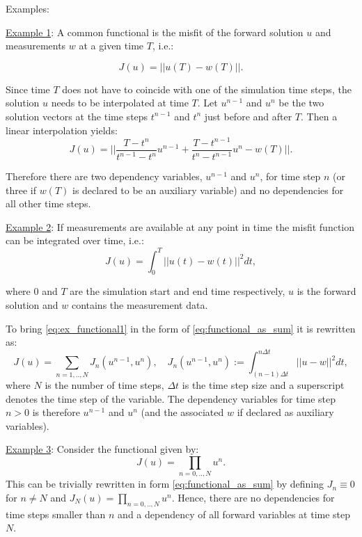 Examples:

\underline{Example 1}:
A common functional is the misfit of the forward solution $u$ and measurements $w$ at a given time $T$, i.e.:

\begin{equation}
J(u) = ||u(T) - w(T)||.
\label{eq:ex_functional1}
\end{equation}

Since time $T$ does not have to coincide with one of the simulation time steps, the solution $u$ needs to be interpolated at time $T$.
Let $u^{n-1}$ and $u^{n}$ be the two solution vectors at the time steps $t^{n-1}$ and $t^{n}$ just before and after $T$.
Then a linear interpolation yields:
\begin{equation}
J(u) = ||\frac{T-t^{n}}{t^{n-1}-t^{n}}u^{n-1} + \frac{T-t^{n-1}}{t^{n}-t^{n-1}}u^{n} - w(T)||.
\label{eq:ex_functional1}
\end{equation}

Therefore there are two dependency variables, $u^{n-1}$ and $u^{n}$, for time step $n$ (or three if $w(T)$ is declared to be an auxiliary variable) and no dependencies for all other time steps.

\underline{Example 2}:
If measurements are available at any point in time the misfit function can be integrated over time, i.e.: 
\begin{equation}
J(u) = \int_0^T ||u(t) - w(t)||^2 dt,
\label{eq:ex_functional1}
\end{equation}

where $0$ and $T$ are the simulation start and end time respectively, $u$ is the forward solution and $w$ contains the measurement data.


To bring \autoref{eq:ex_functional1} in the form of \autoref{eq:functional_as_sum} it is rewritten as:
\begin{equation}
J(u) = \sum_{n=1,..,N} J_n(u^{n-1}, u^{n}), \quad J_n(u^{n-1}, u^{n}) := \int_{(n-1)\Delta t}^{n \Delta t} ||u - w||^2 dt,
\end{equation}
where $N$ is the number of time steps, $\Delta t$ is the time step size and a superscript denotes the time step of the variable.
The dependency variables for time step $n>0$ is therefore $u^{n-1}$ and $u^{n}$ (and the associated $w$ if declared as auxiliary variables).

\underline{Example 3}:
Consider the functional given by: 
\begin{equation}
J(u) = \prod_{n=0,..,N} u^{n}.
\end{equation}
This can be trivially rewritten in form \autoref{eq:functional_as_sum} by defining $J_n \equiv 0$ for $n \ne N$ and $J_N(u) = \prod_{n=0,..,N} u^{n}$.
Hence, there are no dependencies for time steps smaller than $n$ and a dependency of all forward variables at time step $N$.



